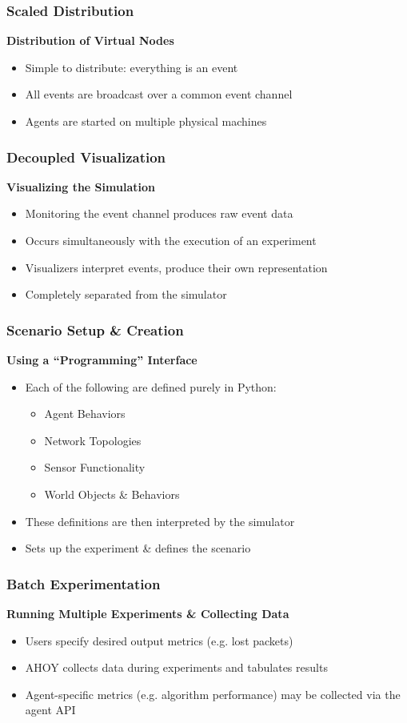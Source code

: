 \documentclass[mathserif]{beamer}
\begin{document}
\frame
{
    \frametitle{Scaled Distribution}
    \textbf{Distribution of Virtual Nodes}
    \begin{itemize}
        \item Simple to distribute: everything is an event
        \item All events are broadcast over a common event channel
        \item Agents are started on multiple physical machines
    \end{itemize}
}

\frame
{
    \frametitle{Decoupled Visualization}
    \textbf{Visualizing the Simulation}
    \begin{itemize}
        \item Monitoring the event channel produces raw event data
        \item Occurs simultaneously with the execution of an experiment
        \item Visualizers interpret events, produce their own representation 
        \item Completely separated from the simulator
    \end{itemize}
}

\frame
{
    \frametitle{Scenario Setup \& Creation}
    \textbf{Using a ``Programming'' Interface}
    \begin{itemize}
        \item Each of the following are defined purely in Python:
        \begin{itemize}
            \item Agent Behaviors 
            \item Network Topologies
            \item Sensor Functionality
            \item World Objects \& Behaviors
        \end{itemize}
        \item These definitions are then interpreted by the simulator
        \item Sets up the experiment \& defines the scenario
    \end{itemize}

}

\frame
{
    \frametitle{Batch Experimentation}
    \textbf{Running Multiple Experiments \& Collecting Data}
    \begin{itemize}
        \item Users specify desired output metrics (e.g. lost packets)
        \item AHOY collects data during experiments and tabulates results
        \item Agent-specific metrics (e.g. algorithm performance) may be collected via the agent API
    \end{itemize}
}
\end{document}
